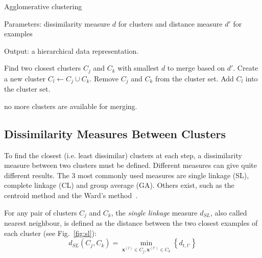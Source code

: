 \begin{algorithm}[ht!]
	\caption{Agglomerative clustering}
    
    Parameters: dissimilarity measure $d$ for clusters and distance measure $d'$ for examples
    
    Output: a hierarchical data representation.
    
	\begin{algorithmic}[1] 
		
        \REPEAT
		
		
		\STATE Find two closest clusters $C_j$ and $C_k$ with smallest $d$ to merge based on $d'$.
		\STATE Create a new cluster $C_l \leftarrow C_j \cup C_k$.
		\STATE Remove $C_j$ and $C_k$ from the cluster set. 
		\STATE Add $C_l$ into the cluster set. 
				
		\UNTIL no more clusters are available for merging.
		
	\end{algorithmic}
	
\end{algorithm}

\subsection{Dissimilarity Measures Between Clusters}
\label{subsec:dissimilarity}

To find the closest (i.e. least dissimilar) clusters at each step, a dissimilarity measure between two clusters must be defined. Different measures can give quite different results. The 3 most commonly used measures are single linkage (SL), complete linkage (CL) and group average (GA). Others exist, such as the centroid method and the Ward's method~\cite{Ward1963}. 

For any pair of clusters $C_j$ and $C_k$, the \textit{single linkage} measure $d_{SL}$, also called nearest neighbour, is defined as the distance between the two closest examples of each cluster (see Fig.~\ref{fig:sl}):
\[
d_{SL}\left ( C_j, C_k \right ) = \min_{\mathbf{x}^{\left ( t \right )} \in C_j, \mathbf{x}^{\left ( t' \right )} \in C_k} \left\{ d_{t,t'} \right\}
\]

